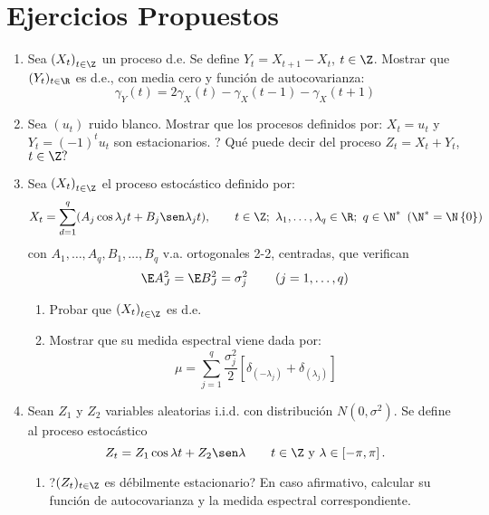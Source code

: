 \section{Ejercicios Propuestos}

\begin{enumerate}
\item Sea ${(X_{t})}_{t\in \Z}$ un proceso d.e. Se define $Y_{t} =X_{t+1} -X_{t}$, $t\in \Z$. Mostrar que $(Y_{t} )_{t\in \R} $ es d.e., con media cero y funci\'{o}n de autocovarianza:
\[
\gamma_{Y} (t)=2\gamma_{X} (t)-\gamma_{X} (t-1)-\gamma_{X} (t+1)
\]

\item Sea $(u_{t})$ ruido blanco. Mostrar que los procesos definidos por: $X_{t} =u_{t}$ y $Y_{t} =(-1)^{t}u_{t}$ son estacionarios. ? Qu\'{e} puede decir del proceso $Z_{t} =X_{t} +Y_{t}$, $t\in \Z?$

\item Sea $\left( {X_{t} } \right)_{t\in \Z} $ el proceso estoc\'{a}stico definido por:
\[
 X_{t} =\sum_{d=1}^q (A_{j} \cos \lambda_{j} t+B_{j} \sen \lambda_{j} t), \qquad 
 t\in \Z;\ \lambda_{1},\ldots,\lambda_{q} \in \R;\ q\in \N^{\ast }\ \left( \N^{\ast }=\N\left\{ 0 \right\} \right)
\]
con $A_{1} ,\ldots,A_{q} ,B_{1} ,\ldots,B_{q} $ v.a. ortogonales 2-2, centradas, 
que verifican 
\[
\E A_{J}^{2} =\E B_{J}^{2} =\sigma_{j}^{2} 
\qquad
\left( {j=1,\ldots,q} \right)
\]
\begin{enumerate}
\item Probar que $\left( {X_{t} } \right)_{t\in\Z} $ es d.e.
\item Mostrar que su medida espectral viene dada por:
\[
\mu =\sum_{j=1}^q \frac{\sigma_{j}^{2} }{2}\left[ {\delta 
_{\left( {-\lambda_{j} } \right)} +\delta_{\left( {\lambda_{j} } \right)} 
} \right]
\]
\end{enumerate}

\item Sean $Z_{1}$ y $Z_{2}$ variables aleatorias i.i.d. con distribuci\'{o}n $N(0, \sigma^{2})$. Se define al proceso estoc\'{a}stico
\begin{equation}\label{eq:1.01}
 Z_{t} =Z_{1} \cos \lambda t+Z_{2} \sen\lambda \qquad t\in \Z\text{ y }\lambda \in \left[ {-\pi ,\pi } \right].
\end{equation}

\begin{enumerate}
\item ?$(Z_{t} )_{t\in \Z} $ es d\'{e}bilmente estacionario? En caso afirmativo, calcular su funci\'{o}n de autocovarianza y la medida espectral correspondiente.



\end{enumerate}
\end{enumerate}
